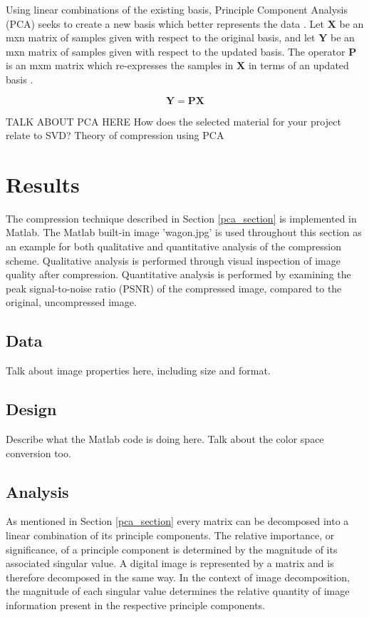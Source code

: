 \documentclass[conference]{IEEEtran}
\begin{document}
    Using linear combinations of the existing basis, Principle Component Analysis (PCA) seeks to create a new basis which better represents the data \cite{shlens_2014_tutorial}. Let $\mathbf{X}$ be an mxn matrix of samples given with respect to the original basis, and let $\mathbf{Y}$ be an mxn matrix of samples given with respect to the updated basis. The operator $\mathbf{P}$ is an mxm matrix which re-expresses the samples in $\mathbf{X}$ in terms of an updated basis \cite{shlens_2014_tutorial}.
    
    \begin{equation}
    		\mathbf{Y} = \mathbf{PX}
    \end{equation}
    
    TALK ABOUT PCA HERE
    How does the selected material for your project relate to SVD?
    Theory of compression using PCA


    \section{Results}

    The compression technique described in Section \ref{pca_section} is implemented in Matlab. The Matlab built-in image 'wagon.jpg' is used throughout this section as an example for both qualitative and quantitative analysis of the compression scheme. Qualitative analysis is performed through visual inspection of image quality after compression. Quantitative analysis is performed by examining the peak signal-to-noise ratio (PSNR) of the compressed image, compared to the original, uncompressed image.

    \subsection{Data}
    Talk about image properties here, including size and format.

    \subsection{Design}
    Describe what the Matlab code is doing here. Talk about the color space conversion too.

    \subsection{Analysis}
    As mentioned in Section \ref{pca_section} every matrix can be decomposed into a linear combination of its principle components. The relative importance, or significance, of a principle component is determined by the magnitude of its associated singular value. A digital image is represented by a matrix and is therefore decomposed in the same way. In the context of image decomposition, the magnitude of each singular value determines the relative quantity of image information present in the respective principle components.
\end{document}
